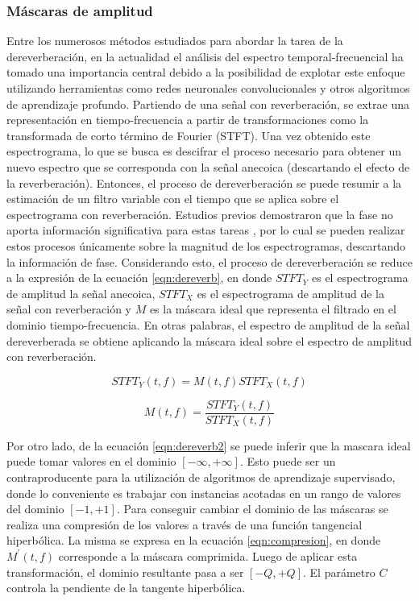 \subsubsection{Máscaras de amplitud}

Entre los numerosos métodos estudiados para abordar la tarea de la dereverberación, en la actualidad el análisis del espectro temporal-frecuencial ha tomado una importancia central debido a la posibilidad de explotar este enfoque utilizando herramientas como redes neuronales convolucionales y otros algoritmos de aprendizaje profundo. Partiendo de una señal con reverberación, se extrae una representación en tiempo-frecuencia a partir de transformaciones como la transformada de corto término de Fourier (STFT). Una vez obtenido este espectrograma, lo que se busca es descifrar el proceso necesario para obtener un nuevo espectro que se corresponda con la señal anecoica (descartando el efecto de la reverberación). Entonces, el proceso de dereverberación se puede resumir a la estimación de un filtro variable con el tiempo que se aplica sobre el espectrograma con reverberación. Estudios previos demostraron que la fase no aporta información significativa para estas tareas \cite{fase1}\cite{fase2}, por lo cual se pueden realizar estos procesos únicamente sobre la magnitud de los espectrogramas, descartando la información de fase. Considerando esto, el proceso de dereverberación se reduce a la expresión de la ecuación \ref{eqn:dereverb}, en donde $STFT_{Y}$ es el espectrograma de amplitud la señal anecoica, $STFT_{X}$ es el espectrograma de amplitud de la señal con reverberación y $M$ es la máscara ideal que representa el filtrado en el dominio tiempo-frecuencia. En otras palabras, el espectro de amplitud de la señal dereverberada se obtiene aplicando la máscara ideal sobre el espectro de amplitud con reverberación. 
 
\begin{equation}
\label{eqn:dereverb}
	STFT_{Y}(t,f)= M(t,f) STFT_{X}(t,f) 
\end{equation}

\begin{equation}
\label{eqn:dereverb2}
	M(t,f) =  \frac{STFT_{Y}(t,f)}{STFT_{X}(t,f)} 
\end{equation}

Por otro lado, de la ecuación \ref{eqn:dereverb2} se puede inferir que la mascara ideal puede tomar valores en el dominio $[-\infty , +\infty]$. Esto puede ser un contraproducente para la utilización de algoritmos de aprendizaje supervisado, donde lo conveniente es trabajar con instancias acotadas en un rango de valores del dominio $[-1 , +1]$. Para conseguir cambiar el dominio de las máscaras se realiza una compresión de los valores a través de una función tangencial hiperbólica. La misma se expresa en la ecuación \ref{eqn:compresion}, en donde $M^{'}(t,f)$ corresponde a la máscara comprimida. Luego de aplicar esta transformación, el dominio resultante pasa a ser $[-Q , +Q]$. El parámetro $C$ controla la pendiente de la tangente hiperbólica. 

